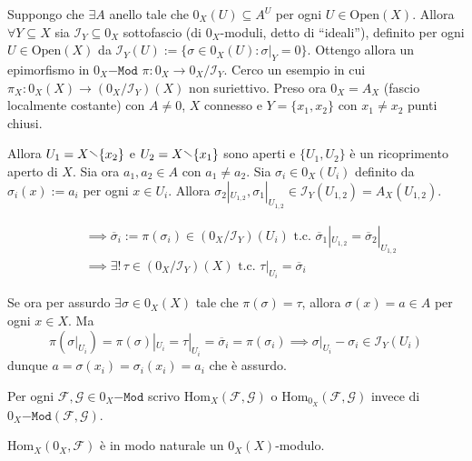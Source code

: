 \begin{example}{}
    Suppongo che \(\exists A\) anello tale che \(0_X{(U)} \subseteq A^{U} \) per
    ogni \(U \in \mathrm{Open}{(X)}\). Allora \(\forall Y \subseteq X \) sia
    \(\mathcal{I}_Y \subseteq 0_X \) sottofascio (di \(0_X\)-moduli, detto di
    ``ideali''), definito per ogni \(U \in \mathrm{Open}{(X)}\) da
    \(\mathcal{I}_Y{(U)} := \{\sigma \in 0_X{(U)} : \sigma|_Y = 0\}\). Ottengo
    allora un epimorfismo in \(0_X\mathtt{-Mod}\) \(\pi: 0_X \to 0_X /
    \mathcal{I}_Y\). Cerco un esempio in cui \(\pi_X : 0_X {(X)} \to {(0_X /
    \mathcal{I}_Y)}{(X)}\) non suriettivo. Preso ora \(0_X = A_X \) (fascio
    localmente costante) con \(A \neq 0\), \(X\) connesso e \(Y = \{x_{1},
    x_{2}\} \) con \(x_{1} \neq x_{2}\) punti chiusi.

Allora \(U_{1} = X \sminus \{x_{2}\} \) e \(U_{2} = X \sminus \{x_{1}\}\)
    sono aperti e \(\{U_{1}, U_{2}\} \) è un ricoprimento aperto di \(X\). Sia
    ora \(a_{1}, a_{2} \in A\) con \(a_{1} \neq a_{2}\). Sia \(\sigma_{i} \in
    0_X{(U_{i})}\) definito da \(\sigma_i{(x)} := a_{i}\) per ogni \(x \in
    U_{i}\). Allora \(\sigma_{2}|_{U_{1,2}}, \sigma_{1}|_{U_{1,2}} \in
    \mathcal{I}_Y{(U_{1,2})} = A_X{(U_{1,2} )}\).

    \begin{align*}
      &\implies \overline{\sigma}_i := \pi{(\sigma_i)}\in {(0_X /
      \mathcal{I}_Y)}{(U_{i})} \text{ t.c. } \overline{\sigma}_1 |_{U_{1,2} } =
        \overline{\sigma}_2|_{U_{1,2}} \\&\implies \exists!\, \tau \in {(0_X /
      \mathcal{I}_Y)}{(X)} \text{ t.c. } \tau|_{U_{i}} = \overline{\sigma}_i
    \end{align*}

    Se ora per assurdo \(\exists \sigma \in 0_X{(X)}\) tale che \(\pi{(\sigma)}
    = \tau\), allora \(\sigma{(x)} = a \in A\) per ogni \(x \in X\). Ma
    \[
      \pi{(\sigma|_{U_{i}} )} = \pi{(\sigma)}|_{U_{i}} = \tau|_{U_{i}} =
      \overline{\sigma}_i = \pi{(\sigma_i)} \implies \sigma|_{U_{i}} - \sigma_i
      \in \mathcal{I}_Y{(U_{i})}
    \]
    dunque \(a = \sigma{(x_{i})} = \sigma_i{(x_{i})} = a_{i}\) che è assurdo.
\end{example}

\begin{note}[zione]
    Per ogni \(\mathcal{F}, \mathcal{G} \in 0_X\mathtt{-Mod}\) scrivo
    \(\mathrm{Hom}_X{(\mathcal{F}, \mathcal{G})}\) o \(\mathrm{Hom}_{0_X}
    {(\mathcal{F}, \mathcal{G})}\) invece di \(0_X\mathtt{-Mod}{(\mathcal{F},
    \mathcal{G})}\).

    \(\mathrm{Hom}_X{(0_X, \mathcal{F})}\) è in modo naturale un
    \(0_X{(X)}\)-modulo.
\end{note}

